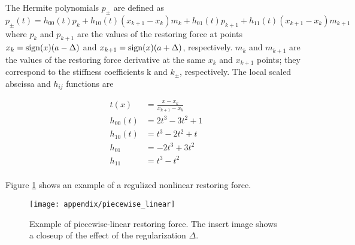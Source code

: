 The Hermite polynomials $p_\pm$ are defined as
\begin{equation}
  \label{eq:fnl_herm_pol}
  p_\pm(t) = h_{00}(t)p_k + h_{10}(t)(x_{k+1}-x_k)m_k + h_{01}(t)p_{k+1} + h_{11}(t)(x_{k+1} - x_k)m_{k+1}
\end{equation}
where $p_k$ and $p_{k+1}$ are the values of the restoring force at points $x_k =
\operatorname{sign}(x)(a - \Delta)$ and $x_{k+1} = \operatorname{sign}(x)(a + \Delta)$, respectively. $m_k$
and $m_{k+1}$ are the values of the restoring force derivative at the same $x_k$
and $x_{k+1}$ points; they correspond to the stiffness coefficients k and
$k_\pm$, respectively. The local scaled abscissa and $h_{ij}$ functions are

\begin{equation}
  \label{eq:fnl_piecewise_coeff}
  \begin{aligned}
    t(x) &= \frac{x - x_k}{x_{k+1} - x_k}\\
    h_{00}(t) &=  2t^3 - 3t^2 + 1 \\
    h_{10}(t) &= t^3 - 2t^2 + t \\
    h_{01} &= -2t^3 + 3t^2 \\
    h_{11} &= t^3 - t^2 \\
  \end{aligned}
\end{equation}

Figure \ref{fig:fnl_piecewise} shows an example of a regulized nonlinear
restoring force.

\begin{figure}[!ht]
  \centering
  \texttt{[image: appendix/piecewise\_linear]}
  \caption{Example of piecewise-linear restoring force. The insert image shows
    a closeup of the effect of the regularization $\Delta$.}
  \label{fig:fnl_piecewise}
\end{figure}



\FloatBarrier


